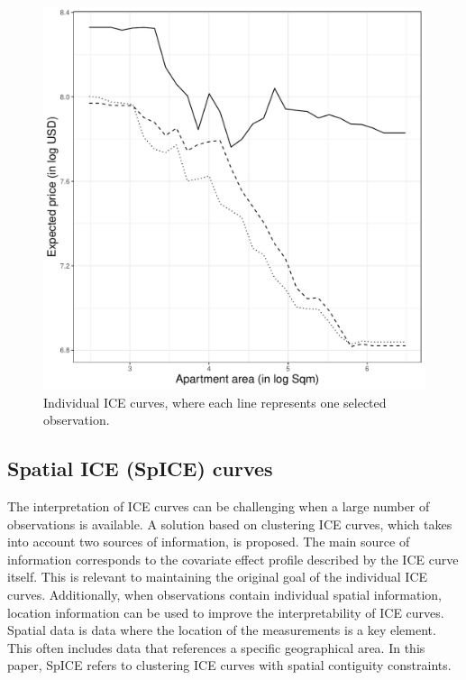 \documentclass[smallextended,natbib]{svjour3}\usepackage[]{graphicx}\usepackage[]{xcolor}
\newcommand{\1}[1]{\mathbbm{1}_{#1}}
\begin{document}
\begin{figure}[htpb]
    \centering
    \includegraphics[scale=.5]{figures/fig-3ice-exmp.pdf}
    \caption{Individual ICE curves, where each line represents one selected observation.}
    \label{fig-3ice} 
\end{figure}

\subsection{Spatial ICE (SpICE) curves} 
\label{seccD}

The interpretation of ICE curves can be challenging when a large number of observations is available. A solution based on clustering ICE curves, which takes into account two sources of information, is proposed. The main source of information corresponds to the covariate effect profile described by the ICE curve itself. This is relevant to maintaining the original goal of the individual ICE curves. Additionally, when observations contain individual spatial information, location information can be used to improve the interpretability of ICE curves. Spatial data is data where the location of the measurements is a key element. This often includes data that references a specific geographical area. In this paper, SpICE refers to clustering ICE curves with spatial contiguity constraints.
\end{document}
